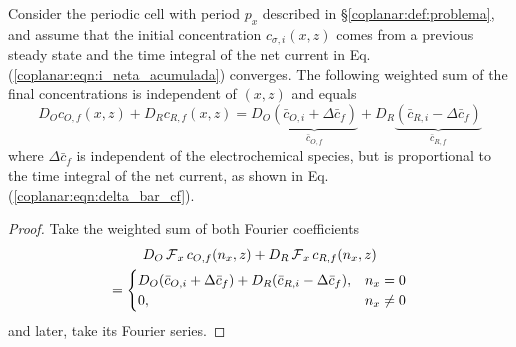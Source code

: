 \begin{corolario}
	\label{coplanar:cor:cf:total}
	Consider the periodic cell with period $p_{x}$ described in \S\ref{coplanar:def:problema},
	and assume that the initial concentration $c_{\sigma,i}(x,z)$ comes from a previous steady state
	and the time integral of the net current in Eq. (\ref{coplanar:eqn:i_neta_acumulada}) converges. 
	The following weighted sum of the final concentrations is independent of $(x,z)$ and equals
	\begin{equation}
		D_{O} c_{O,f}(x,z) + D_{R} c_{R,f}(x,z) =
		D_{O} \underbrace{(\bar{c}_{O,i} + \Delta \bar{c}_{f})}_{\bar{c}_{O,f}} +
		D_{R} \underbrace{(\bar{c}_{R,i} - \Delta \bar{c}_{f})}_{\bar{c}_{R,f}}
	\end{equation}
	where $\Delta \bar{c}_{f}$ is independent of the electrochemical species,
	but is proportional to the time integral of the net current,
	as shown in Eq. (\ref{coplanar:eqn:delta_bar_cf}).
\end{corolario}

\begin{proof}
	Take the weighted sum of both Fourier coefficients
	\begin{multline}
		D_{O} \operatorname{\mathcal{F}}_{x} c_{O,f}(n_{x},z) + D_{R} \operatorname{\mathcal{F}}_{x} c_{R,f}(n_{x},z)
		\\
		= \begin{cases}
			D_{O} (\bar{c}_{O,i} + \Delta \bar{c}_{f}) +
			D_{R} (\bar{c}_{R,i} - \Delta \bar{c}_{f}), & n_{x} = 0
			\\
			0, & n_{x} \neq 0
		\end{cases}
	\end{multline}
	and later, take its Fourier series.
\end{proof}
